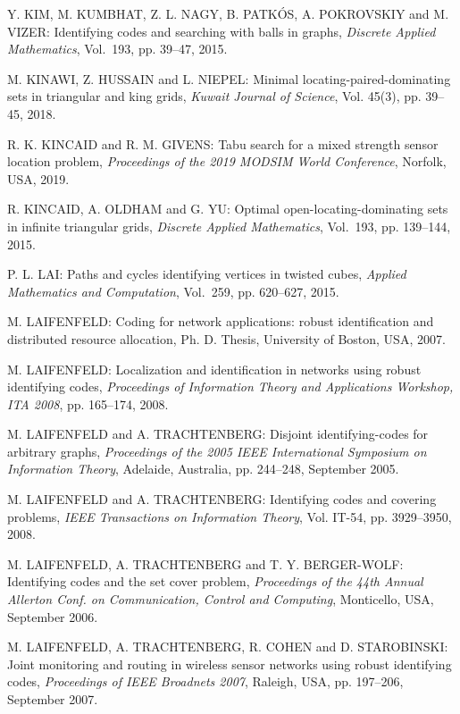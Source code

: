 \begin{thebibliography}{999}
Y. KIM, M. KUMBHAT, Z. L. NAGY, B. PATK\'OS, A. POKROVSKIY and M. VIZER: Identifying codes and searching with balls in graphs, {\it Discrete Applied Mathematics}, Vol.~193, pp. 39--47, 2015.

M. KINAWI, Z. HUSSAIN and L. NIEPEL: Minimal locating-paired-dominating sets in triangular and king grids, {\it Kuwait Journal of Science}, Vol. 45(3), pp. 39--45, 2018.

R. K. KINCAID and R. M. GIVENS: Tabu search for a mixed strength sensor location problem, {\it Proceedings of the 2019 MODSIM World Conference}, Norfolk, USA, 2019.

R. KINCAID, A. OLDHAM and G. YU: Optimal open-locating-dominating sets in infinite triangular grids, {\it Discrete Applied Mathematics}, Vol.~193, pp. 139--144, 2015.

P. L. LAI: Paths and cycles identifying vertices in twisted cubes, {\it Applied Mathematics and Computation}, Vol.~259, pp. 620--627, 2015.

M. LAIFENFELD: Coding for network applications: robust identification and distributed resource allocation, Ph. D. Thesis, University of Boston, USA, 2007. 

M. LAIFENFELD: Localization and identification in networks using robust identifying codes, {\it Proceedings of Information Theory and Applications Workshop, ITA 2008}, pp. 165--174, 2008.

M. LAIFENFELD and A. TRACHTENBERG: Disjoint identifying-codes for arbitrary graphs, {\it Proceedings of the 2005 IEEE International Symposium on Information Theory}, Adelaide, Australia, pp. 244--248, September 2005.

M. LAIFENFELD and A. TRACHTENBERG: Identifying codes and covering problems, {\it IEEE Transactions on Information Theory}, Vol. IT-54, pp. 3929--3950, 2008.

M. LAIFENFELD, A. TRACHTENBERG and T. Y. BERGER-WOLF: Identifying codes and the set cover problem, {\it Proceedings of the 44th Annual Allerton Conf. on Communication, Control and Computing}, Monticello, USA, September 2006.

M. LAIFENFELD, A. TRACHTENBERG, R. COHEN and D. STARO\-BINSKI: Joint monitoring and routing in wireless sensor networks using robust identifying codes, {\it Proceedings of IEEE Broadnets 2007}, Raleigh, USA, pp. 197--206, September 2007.


\end{thebibliography}
